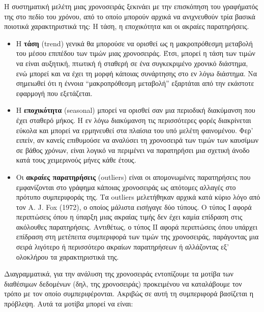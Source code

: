 Η συστηματική μελέτη μιας χρονοσειράς ξεκινάει με την επισκόπηση του
γραφήματός της στο πεδίο του χρόνου, από το οποίο μπορούν αρχικά να ανιχνευθούν
τρία βασικά ποιοτικά χαρακτηριστικά της: Η τάση, η εποχικότητα και οι ακραίες
παρατηρήσεις.\\
\begin{itemize}

\item Η \textbf{τάση} (trend) γενικά θα μπορούσε να ορισθεί ως η μακροπρόθεσμη μεταβολή του
μέσου επιπέδου των τιμών μιας χρονοσειράς. Έτσι, μπορεί η τάση των τιμών να είναι
αυξητική, πτωτική ή σταθερή σε ένα συγκεκριμένο χρονικό διάστημα, ενώ μπορεί και να
έχει τη μορφή κάποιας συνάρτησης στο εν λόγω διάστημα. Να σημειωθεί ότι η έννοια
“μακροπρόθεσμη μεταβολή” εξαρτάται από την εκάστοτε εφαρμογή που εξετάζεται.
\item Η \textbf{εποχικότητα} (seasonal) μπορεί να ορισθεί σαν μια περιοδική διακύμανση που έχει
σταθερό μήκος. Η εν λόγω διακύμανση τις περισσότερες φορές διακρίνεται εύκολα και
μπορεί να ερμηνευθεί στα πλαίσια του υπό μελέτη φαινομένου. Φερ' ειπείν, αν
κανείς επιθυμούσε να αναλύσει τη χρονοσειρά των τιμών των καυσίμων σε βάθος
χρόνων, είναι λογικό να περιμένει να παρατηρήσει μια σχετική άνοδο κατά τους
χειμερινούς μήνες κάθε έτους.

\item Οι \textbf{ακραίες παρατηρήσεις} (outliers) είναι οι απομονωμένες παρατηρήσεις που
εμφανίζονται στο γράφημα κάποιας χρονοσειράς ως απότομες αλλαγές στο πρότυπο
συμπεριφοράς της. Τα outliers μελετήθηκαν αρχικά κατά κύριο λόγο από τον A. J. Fox
(1972), ο οποίος μάλιστα εισήγαγε δύο τύπους. Ο τύπος I αφορά περιπτώσεις όπου η
ύπαρξη μιας ακραίας τιμής δεν έχει καμία επίδραση στις ακόλουθες παρατηρήσεις.
Αντιθέτως, ο τύπος ΙΙ αφορά περιπτώσεις όπου υπάρχει επίδραση στη μετέπειτα
συμπεριφορά των τιμών της χρονοσειράς, παράγοντας μια σειρά λιγότερο ή περισσότερο
ακραίων παρατηρήσεων ή αλλάζοντας εξ’ ολοκλήρου τα χαρακτηριστικά της.
\end{itemize}
Διαγραμματικά, για την ανάλυση της χρονοσειράς εντοπίζουμε τα μοτίβα των διαθέσιμων δεδομένων
(δηλ, της χρονοσειράς) προκειμένου να καταλάβουμε τον τρόπο με τον οποίο
συμπεριφέρονται. Ακριβώς σε αυτή τη συμπεριφορά βασίζεται η πρόβλεψη. Αυτά τα
μοτίβα μπορεί να είναι:\\
